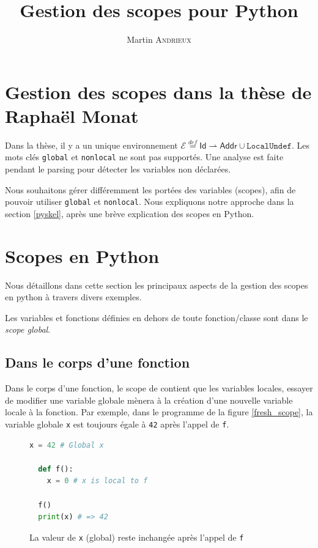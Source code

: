 \documentclass[a4paper, french, 11pt]{article}
\date{}
\title{Gestion des scopes pour Python}
\author{Martin \textsc{Andrieux}}
\theoremstyle{break}
\begin{document}
\maketitle

\section{Gestion des scopes dans la thèse de Raphaël Monat}
Dans la thèse, il y a un unique environnement \(\mathcal E \overset{def}{=} \mathsf{Id} \rightharpoonup \mathsf{Addr} \cup \mathtt{LocalUndef}\).
Les mots clés \texttt{global} et \texttt{nonlocal} ne sont pas supportés.
Une analyse est faite pendant le parsing pour détecter les variables non déclarées.

Nous souhaitons gérer différemment les portées des variables (scopes), afin de pouvoir utiliser \texttt{global} et \texttt{nonlocal}.
Nous expliquons notre approche dans la section \vref{pyskel}, après une brève explication des scopes en Python.

\section{Scopes en Python}
Nous détaillons dans cette section les principaux aspects de la gestion des scopes en python à travers divers exemples.

Les variables et fonctions définies en dehors de toute fonction/classe sont dans le \emph{scope global}.

\subsection{Dans le corps d'une fonction}
Dans le corps d'une fonction, le scope de contient que les variables locales, essayer de modifier une variable globale mènera à la création d'une nouvelle variable locale à la fonction.
Par exemple, dans le programme de la figure \vref{fresh_scope}, la variable globale \texttt{x} est toujours égale à \texttt{42} après l'appel de \texttt{f}.

\begin{figure}[h]
  \centering
  \begin{minipage}{0.5\linewidth}
\begin{lstlisting}[style=myStyle, language=python]
  x = 42 # Global x

  def f():
    x = 0 # x is local to f

  f()
  print(x) # => 42\end{lstlisting}
\end{minipage}
\caption{\label{fresh_scope}La valeur de \texttt{x} (global) reste inchangée après l'appel de \texttt{f}}
\end{figure}
\end{document}

